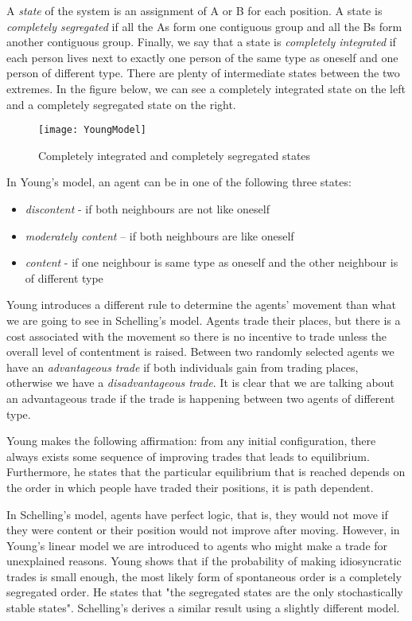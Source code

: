 \documentclass[../main.tex]{subfiles}
\begin{document}
A \textit{state} of the system is an assignment of A or B for each position. A state is \textit{completely segregated} if all the As form one contiguous group and all the Bs form another contiguous group. Finally, we say that a state is \textit{completely integrated} if each person lives next to exactly one person of the same type as oneself and one person of different type. There are plenty of intermediate states between the two extremes. In the figure below, we can see a completely integrated state on the left and a completely segregated state on the right.

\begin{figure}[H]
\centering
\texttt{[image: YoungModel]}
\caption{Completely integrated and completely segregated states}
\end{figure}

In Young’s model, an agent can be in one of the following three states:
\begin{itemize}
  \item \textit{discontent} -  if both neighbours are not like oneself
  \item \textit{moderately content} – if both neighbours are like oneself
  \item \textit{content} - if one neighbour is same type as oneself and the other neighbour is of different type
\end{itemize}

Young introduces a different rule to determine the agents’ movement than what we are going to see in Schelling’s model. Agents trade their places, but there is a cost associated with the movement so there is no incentive to trade unless the overall level of contentment is raised. Between two randomly selected agents we have an \textit{advantageous trade} if both individuals gain from trading places, otherwise we have a \textit{disadvantageous trade}. It is clear that we are talking about an advantageous trade if the trade is happening between two agents of different type.  

Young makes the following affirmation: from any initial configuration, there always exists some sequence of improving trades that leads to equilibrium. Furthermore, he states that the particular equilibrium that is reached depends on the order in which people have traded their positions, it is path dependent. 

In Schelling's model, agents have perfect logic, that is, they would not move if they were content or their position would not improve after moving. However, in Young's linear model we are introduced to agents who might make a trade for unexplained reasons. Young shows that if the probability of making idiosyncratic trades is small enough, the most likely form of spontaneous order is a completely segregated order. He states that "the segregated states are the only stochastically stable states". Schelling's derives a similar result using a slightly different model.
\end{document}
